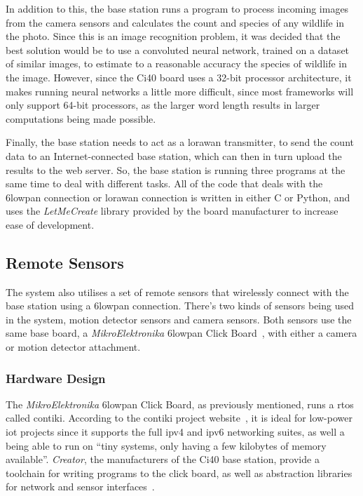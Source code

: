In addition to this, the base station runs a program to process incoming
images from the camera sensors and calculates the count and species of any
wildlife in the photo. Since this is an image recognition problem, it was
decided that the best solution would be to use a convoluted neural network,
trained on a dataset of similar images, to estimate to a reasonable accuracy
the species of wildlife in the image. However, since the Ci40 board uses a
32-bit processor architecture, it makes running neural networks a little more
difficult, since most frameworks will only support 64-bit processors, as the
larger word length results in larger computations being made possible.

Finally, the base station needs to act as a \gls{lorawan} transmitter, to
send the count data to an Internet-connected base station, which can then in
turn upload the results to the web server. So, the base station is running
three programs at the same time to deal with different tasks. All of the code
that deals with the \gls{6lowpan} connection or \gls{lorawan} connection is
written in either C or Python, and uses the \textit{LetMeCreate} library
provided by the board manufacturer to increase ease of development.

\subsection{Remote Sensors}


The system also utilises a set of remote sensors that wirelessly connect with
the base station using a \gls{6lowpan} connection. There's two kinds of
sensors being used in the system, motion detector sensors and camera sensors.
Both sensors use the same base board, a \textit{MikroElektronika}
\gls{6lowpan} Click Board~\cite{mikroeclick}, with either a camera or motion
detector attachment.

\subsubsection{Hardware Design}

The \textit{MikroElektronika} \gls{6lowpan} Click Board, as previously
mentioned, runs a \acrfull{rtos} called \gls{contiki}. According to the
\gls{contiki} project website~\cite{contiki}, it is ideal for low-power
\acrshort{iot} projects since it supports the full \acrshort{ipv4} and
\acrshort{ipv6} networking suites, as well a being able to run on ``tiny
systems, only having a few kilobytes of memory available''. \textit{Creator},
the manufacturers of the Ci40 base station, provide a toolchain for writing
programs to the click board, as well as abstraction libraries for network and
sensor interfaces~\cite{letmecreate}.

